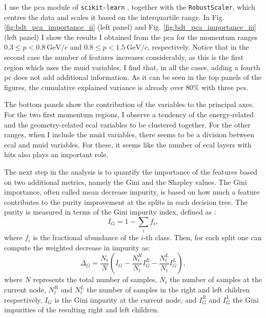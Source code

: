 I use the \gls{pca} module of \texttt{scikit-learn} \cite{scikit-learn}, together with the \texttt{RobustScaler}, which centres the data and scales it based on the interquartile range. In Fig. \ref{fig:bdt_pca_importance_ii} (left panel) and Fig. \ref{fig:bdt_pca_importance_iii} (left panel) I show the results I obtained from the \gls{pca} for the momentum ranges $0.3 \leq p < 0.8 ~ \mathrm{GeV}/c$ and $0.8 \leq p < 1.5 ~ \mathrm{GeV}/c$, respectively. Notice that in the second case the number of features increases considerably, as this is the first region which uses the \gls{muid} variables. I find that, in all the cases, adding a fourth \gls{pc} does not add additional information. As it can be seen in the top panels of the figures, the cumulative explained variance is already over $80\%$ with three \gls{pc}s.

The bottom panels show the contribution of the variables to the principal axes. For the two first momentum regions, I observe a tendency of the energy-related and the geometry-related \gls{ecal} variables to be clustered together. For the other ranges, when I include the \gls{muid} variables, there seems to be a division between \gls{ecal} and \gls{muid} variables. For these, it seems like the number of \gls{ecal} layers with hits also plays an important role.

The next step in the analysis is to quantify the importance of the features based on two additional metrics, namely the Gini and the Shapley values. The Gini importance, often called mean decrease impurity, is based on how much a feature contributes to the purity improvement at the splits in each decision tree. The purity is measured in terms of the Gini impurity index, defined as \cite{Jost2006}:
\begin{equation}
	I_{G} = 1 - \sum_{i} f_{i},
\end{equation}
where $f_{i}$ is the fractional abundance of the $i$-th class. Then, for each split one can compute the weighted decrease in impurity as:
\begin{equation}
	\Delta_{G} = \frac{N_{t}}{N} \left(I_{G} - \frac{N_{t}^{R}}{N_{t}} I_{G}^{R} - \frac{N_{t}^{L}}{N_{t}} I_{G}^{L}\right),
\end{equation}
where $N$ represents the total number of samples, $N_{t}$ the number of samples at the current node, $N_{t}^{R}$ and $N_{t}^{L}$ the number of samples in the right and left children respectively, $I_{G}$ is the Gini impurity at the current node, and $I_{G}^{R}$ and $I_{G}^{L}$ the Gini impurities of the resulting right and left children.

